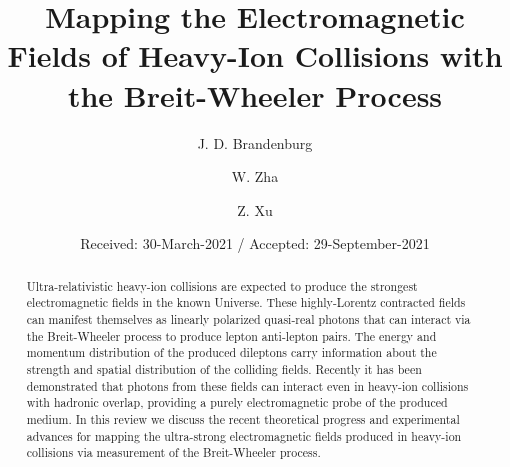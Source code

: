 \documentclass[12pt,epjc3]{svjour3}\sloppy
\begin{document}
\title{Mapping the Electromagnetic Fields of Heavy-Ion Collisions with the Breit-Wheeler Process %
}

\author{J. D. Brandenburg
        \and
        W. Zha %
        \and
        Z. Xu 
}




\date{Received: 30-March-2021 / Accepted: 29-September-2021}


\maketitle

\begin{abstract}
Ultra-relativistic heavy-ion collisions are expected to produce the strongest electromagnetic fields in the known Universe. 
These highly-Lorentz contracted fields can manifest themselves as linearly polarized quasi-real photons that can interact via the Breit-Wheeler process to produce lepton anti-lepton pairs. The energy and momentum distribution of the produced dileptons carry information about the strength and spatial distribution of the colliding fields. Recently it has been demonstrated that photons from these fields can interact even in heavy-ion collisions with hadronic overlap, providing a purely electromagnetic probe of the produced medium. In this review we discuss the recent theoretical progress and experimental advances for mapping the ultra-strong electromagnetic fields produced in heavy-ion collisions via measurement of the Breit-Wheeler process. 
\end{abstract}
\end{document}
